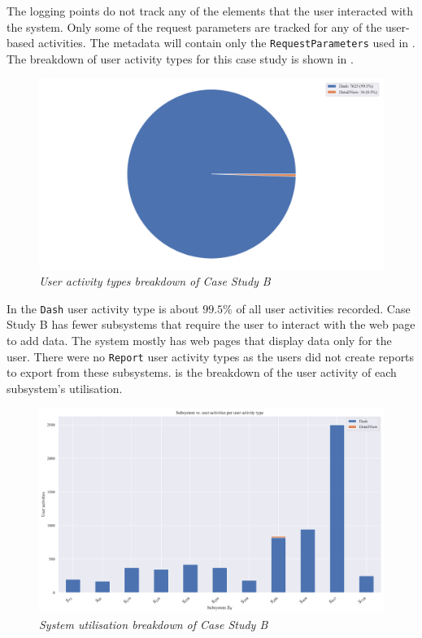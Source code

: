 The logging points do not track any of the elements that the user interacted with the system. Only some of the request parameters are tracked for any of the user-based activities. The metadata will contain only the \texttt{RequestParameters} used in . The breakdown of user activity types for this case study is shown in .

\begin{figure}[!htb]
	\centering %
	\includegraphics[width=0.95\linewidth]{img/ch3/analysis/case_B_breakdown.pdf}
	\caption[User activity types breakdown of Case Study B]
	{\textit{User activity types breakdown of Case Study B}}\label{fig:ch3_caseBBreakdown}
\end{figure}

In  the \texttt{Dash} user activity type is about $99.5\%$ of all user activities recorded. Case Study B has fewer subsystems that require the user to interact with the web page to add data. The system mostly has web pages that display data only for the user. There were no \texttt{Report} user activity types as the users did not create reports to export from these subsystems.  is the breakdown of the user activity of each subsystem's utilisation.

\clearpage

\begin{figure}[!htb]
	\centering %
	\includegraphics[width=0.95\linewidth]{img/ch3/analysis/case_B_subsystems_1.pdf}
	\caption[System utilisation breakdown of Case Study B]
	{\textit{System utilisation breakdown of Case Study B}}\label{fig:ch3_caseBAnalysis}
\end{figure} 

